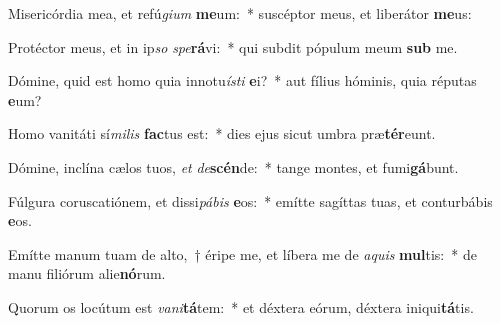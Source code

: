 \item Misericórdia mea, et refú\textit{gi}\textit{um} \textbf{me}um:~* suscéptor meus, et liberátor \textbf{me}us:
\item Protéctor meus, et in ip\textit{so} \textit{spe}\textbf{rá}vi:~* qui subdit pópulum meum \textbf{sub} me.
\item Dómine, quid est homo quia innotu\textit{ís}\textit{ti} \textbf{e}i?~* aut fílius hóminis, quia réputas \textbf{e}um?
\item Homo vanitáti sí\textit{mi}\textit{lis} \textbf{fac}tus est:~* dies ejus sicut umbra præ\textbf{tér}eunt.
\item Dómine, inclína cælos tuos, \textit{et} \textit{de}\textbf{scén}de:~* tange montes, et fumi\textbf{gá}bunt.
\item Fúlgura coruscatiónem, et dissi\textit{pá}\textit{bis} \textbf{e}os:~* emítte sagíttas tuas, et conturbábis \textbf{e}os.
\item Emítte manum tuam de alto,~† éripe me, et líbera me de \textit{a}\textit{quis} \textbf{mul}tis:~* de manu filiórum alie\textbf{nó}rum.
\item Quorum os locútum est \textit{va}\textit{ni}\textbf{tá}tem:~* et déxtera eórum, déxtera iniqui\textbf{tá}tis.
